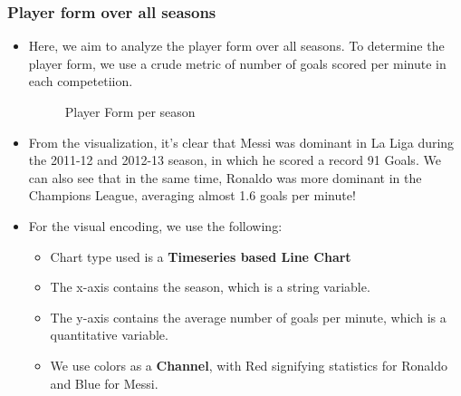 \documentclass[a4paper]{article}
\begin{document}
\subsubsection{Player form over all seasons}
\begin{itemize}
    \item Here, we aim to analyze the player form over all seasons. To determine the player form, we use a crude metric of number of goals scored per minute in each competetiion.
    \begin{figure}[H]
        \centering
        \qquad
        \caption{Player Form per season}
        \label{fig:form}
    \end{figure}
    \item From the visualization, it's clear that Messi was dominant in La Liga during the 2011-12 and 2012-13 season, in which he scored a record 91 Goals. We can also see that in the same time, Ronaldo was more dominant in the Champions League, averaging almost 1.6 goals per minute!
    \item For the visual encoding, we use the following:
    \begin{itemize}
        \item Chart type used is a \textbf{Timeseries based Line Chart}  
        \item The x-axis contains the season, which is a string variable.
        \item The y-axis contains the average number of goals per minute, which is a quantitative variable.
        \item We use colors as a \textbf{Channel}, with Red signifying statistics for Ronaldo and Blue for Messi.  
    \end{itemize}
\end{itemize}
\end{document}
